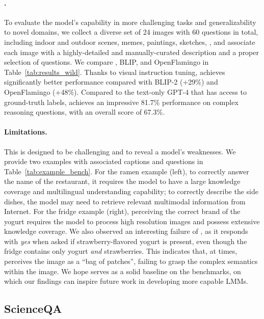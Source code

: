 \paragraph{\benchwild{}.}
To evaluate the model's capability in more challenging tasks and generalizability to novel domains, we collect a diverse set of 24 images with 60 questions in total, including indoor and outdoor scenes, memes, paintings, sketches, \etc, and associate each image with a highly-detailed and manually-curated description and a proper selection of questions.
We compare \shortname{}, BLIP, and OpenFlamingo in Table~\ref{tab:results_wild}. Thanks to visual instruction tuning, \shortname{} achieves significantly better performance compared with BLIP-2 (+29\%) and OpenFlamingo (+48\%).
Compared to the text-only GPT-4 that has access to ground-truth labels, \shortname{} achieves an impressive 81.7\% performance on complex reasoning questions, with an overall score of 67.3\%.

\paragraph{Limitations.}
This \benchwild{} is designed to be challenging and to reveal a model's weaknesses.  We provide two examples with associated captions and questions in Table~\ref{tab:example_bench}.
For the ramen example (left), to correctly answer the name of the restaurant, it requires the model to have a large knowledge coverage and multilingual understanding capability; to correctly describe the side dishes, the model may need to retrieve relevant multimodal information from Internet.
For the fridge example (right), perceiving the correct brand of the yogurt requires the model to process high resolution images and possess extensive knowledge coverage. We also observed an interesting failure of \shortname{}, as it responds with \emph{yes} when asked if strawberry-flavored yogurt is present, even though the fridge contains only yogurt \emph{and} strawberries. This indicates that, at times, \shortname{} perceives the image as a ``bag of patches'', failing to grasp the complex semantics within the image.
We hope \shortname{} serves as a solid baseline on the benchmarks, on which our findings can inspire future work in developing more capable LMMs.



\subsection{ScienceQA}


